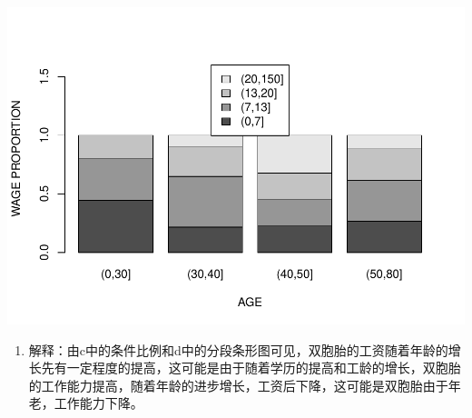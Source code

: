 \documentclass[]{article}
\providecommand{\tightlist}{%
  \setlength{\itemsep}{0pt}\setlength{\parskip}{0pt}}
\begin{document}
\includegraphics{Homework_3_files/figure-latex/unnamed-chunk-5-1.pdf}

\begin{enumerate}
\def\labelenumi{\alph{enumi}.}
\setcounter{enumi}{4}
\tightlist
\item
  解释：由c中的条件比例和d中的分段条形图可见，双胞胎的工资随着年龄的增长先有一定程度的提高，这可能是由于随着学历的提高和工龄的增长，双胞胎的工作能力提高，随着年龄的进步增长，工资后下降，这可能是双胞胎由于年老，工作能力下降。
\end{enumerate}
\end{document}
